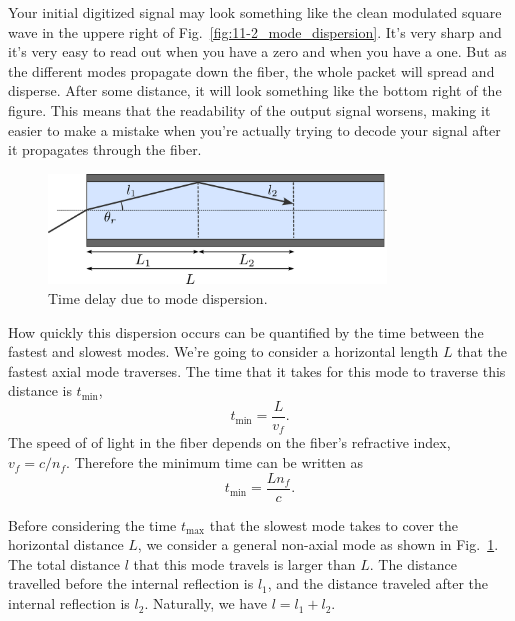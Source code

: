Your initial digitized signal may look something like the clean modulated square wave in the uppere right of Fig.~\ref{fig:11-2_mode_dispersion}. It's very sharp and it's very easy to read out when you have a zero and when you have a one. But as the different modes propagate down the fiber, the whole packet will spread and disperse. After some distance, it will look something like the bottom right of the figure.
This means that the readability of the output signal worsens, making it easier to make a mistake when you're actually trying to decode your signal after it propagates through the fiber.

\begin{figure}
    \centering
    \includegraphics[width=0.8\textwidth]{lesson11/11-2_dispersion_delay.pdf}
    \caption[Time delay due to mode dispersion]{Time delay due to mode dispersion.}
    \label{fig:11-2_dispersion_delay}
\end{figure}

How quickly this dispersion occurs can be quantified by the time between the fastest and slowest modes.
We're going to consider a horizontal length $L$ that the fastest axial mode traverses. The time that it takes for this mode to traverse this distance is $t_{\text{min}}$,
\begin{equation}
    t_{\min } =\frac{L}{v_f}.
\end{equation}
The speed of of light in the fiber depends on the fiber's refractive index, $v_f = c / n_f$.
Therefore the minimum time can be written as
\begin{equation}
    t_{\min } =\frac{Ln_f}{c}.
\end{equation}

Before considering the time $t_{\max}$ that the slowest mode takes to cover the horizontal distance $L$, we consider a general non-axial mode as shown in Fig.~\ref{fig:11-2_dispersion_delay}.
The total distance $l$ that this mode travels is larger than $L$.
The distance travelled before the internal reflection is $l_1$, and the distance traveled after the internal reflection is $l_2$.
Naturally, we have $l = l_1 + l_2$.

